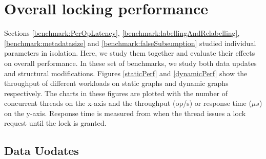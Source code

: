 

\section{Overall locking performance}
Sections \ref{benchmark:PerOpLatency}, \ref{benchmark:labellingAndRelabelling}, \ref{benchmark:metadatasize} and \ref{benchmark:falseSubsumption} studied individual parameters in isolation. Here, we study them together and evaluate their effects on overall performance. 
In these set of benchmarks, we study both data updates and structural modifications. 
Figures \ref{staticPerf} and \ref{dynamicPerf} show the throughput of different workloads on static graphs and dynamic graphs respectively. 
The charts in these figures are plotted with the number of concurrent threads on the x-axis and the throughput (op/s) or response time ($\mu s$) on the y-axis. 
Response time is measured from when the thread issues a lock request until the lock is granted.


\subsection{Data Uodates} \label{benchmark:StaticOverallPerf}


